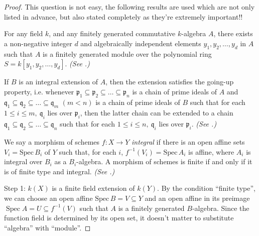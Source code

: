 \begin{proof}
	This question is not easy,  the following results are used which are not only listed in advance,  but also stated completely as they're extremely important!!
	\begin{theorem}
		\label{t1}
		For any field $k$, and any finitely generated commutative $k$-algebra $A$, there exists a non-negative integer $d$ and algebraically independent elements $y_{1}, y_{2}, \dots, y_{d}$ in $A$ such that $A$ is a finitely generated module over the polynomial ring $S=k\left[y_{1}, y_{2}, \dots, y_{d}\right]$. \emph{(See \cite[Ch. 5, Ex. 16, P. 69]{ATIY}.)}
	\end{theorem}
	\begin{theorem}[``Going-up'']
		\label{t2}
		If $B$ is an integral extension of $A$, then the extension satisfies the going-up property,  i.e.  whenever $\mathfrak{p}_{1} \subseteq \mathfrak{p}_{2} \subseteq \dots \subseteq \mathfrak{p}_{n}$ is a chain of prime ideals of $A$ and $\mathfrak{q}_{1} \subseteq \mathfrak{q}_{2} \subseteq \dots \subseteq \mathfrak{q}_{m}$ $(m<n)$ is a chain of prime ideals of $B$ such that for each $1 \leq i \leq m,\  \mathfrak{q}_{i}$ lies over $\mathfrak{p}_{i}$, then the latter chain can be extended to a chain 
		$\mathfrak{q}_{1} \subseteq \mathfrak{q}_{2} \subseteq \dots \subseteq \mathfrak{q}_{n}$ such that for each $1 \leq i \leq n,\ \mathfrak{q}_{i}$ lies over $\mathfrak{p}_{i}$. \emph{(See \cite[Ch. 5, Th. 5.11, P. 62]{ATIY}.)}
	\end{theorem}
	\begin{lm}
		\label{l9}
		We say a morphism of schemes $f:X\to Y$ \emph{integral} if there is an open affine sets $V_i=\mathrm{Spec}\,B_i$ of $Y$ such that, for each $i$, $f^{-1}(V_i)=\mathrm{Spec}\,A_i$ is affine, where $A_i$ is integral over $B_i$ as a $B_i$-algebra. A morphism of schemes is finite if and only if it is of finite type and integral. \emph{(See \cite[Def. 6.1.1 and Prop. 6.1.4, P. 110]{EGA2}.)}
	\end{lm}
	Step 1: $k(X)$ is a finite field extension of $k(Y)$.  By the condition ``finite type'',  we can choose an open affine $\mathrm{Spec}\, B=V \subseteq Y$ and an open affine in its preimage $\operatorname{Spec} A=U \subseteq f^{-1} (V)$ such that $A$ is a finitely generated $B$-algebra.   Since the function field is determined by its open set,  it doesn't matter to substitute ``algebra'' with ``module''.   
	

\end{proof}
